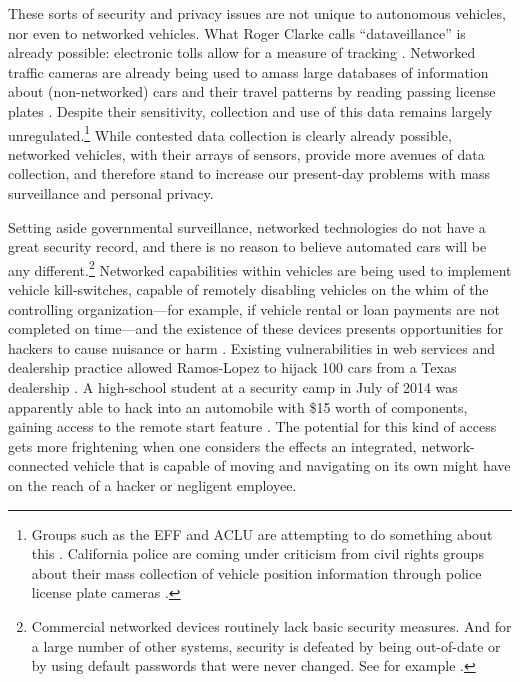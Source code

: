 
These sorts of security and privacy issues are not unique to
autonomous vehicles, nor even to networked vehicles. What Roger Clarke
calls ``dataveillance'' is already possible: electronic tolls
allow for a measure of tracking \cite[p. 25]{nissenbaum}. Networked
traffic cameras are 
already being used to amass large databases of information about
(non-networked) cars and their travel patterns by reading passing
license plates \cite[p. 26]{nissenbaum}. 
Despite their sensitivity, collection and use of this data
remains largely unregulated.\footnote{Groups such as the EFF and ACLU
  are attempting to do something about this \cite{kayyaliEFF}. California police are coming under 
criticism from civil rights groups about their mass collection of
vehicle position information through police license plate cameras \cite{maassCivil}.}
While contested data collection is clearly already
possible, networked vehicles, with their arrays of sensors,
provide more avenues of data collection, and therefore stand to
increase our present-day problems with mass surveillance and personal
privacy.

Setting aside governmental surveillance, networked technologies do not
have a great security record, 
and there is no reason to believe automated cars will be any
different.\footnote{Commercial networked devices routinely lack basic
security measures. And for a large number of other systems, security
is defeated by being out-of-date or by using default passwords that
were never changed. See for example \cite{zetter}.}
Networked capabilities within vehicles are being used to
implement vehicle kill-switches, capable of remotely disabling
vehicles on the whim of the controlling organization---for example, if
vehicle rental or loan payments are not completed on time---and the existence of these devices
presents opportunities for hackers to cause nuisance or
harm \cite{goodman}.
Existing vulnerabilities in web services and dealership practice
allowed Ramos-Lopez to hijack 100 cars from a Texas dealership
\cite{poulsenHacker}. A high-school student at a security camp in July
of 2014 was apparently 
able to hack into an automobile with \$15 worth of components, gaining
access to the remote start 
feature \cite{bigelow14}.
The potential for this kind of access gets more frightening when one
considers the effects an integrated, network-connected vehicle that is capable of
moving and navigating on its own might have on the reach of a hacker or negligent employee.

